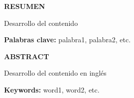\thispagestyle{empty} %
\medspace
\vspace{1.5cm}
\begin{center}
	\large \bf RESUMEN
\end{center}

\vspace{1cm}

Desarrollo del contenido 


\vspace{1cm}

\textbf{Palabras clave:} palabra1, palabra2, etc.


\break

\thispagestyle{empty} %
\medspace
\vspace{2cm}

\begin{center}
	\large \bf ABSTRACT
\end{center}

\vspace{1cm}

Desarrollo del contenido en inglés


\vspace{1cm}

\textbf{Keywords:} word1, word2, etc.





